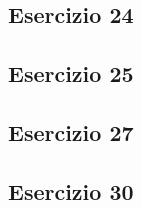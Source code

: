 \subsection{Esercizio 24}


\subsection{Esercizio 25}


\subsection{Esercizio 27}


\subsection{Esercizio 30}

